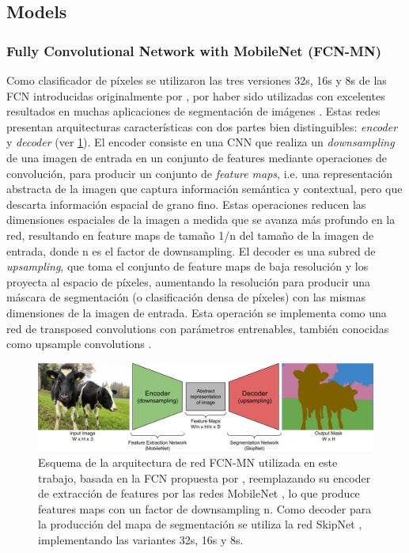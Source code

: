\documentclass[a4paper,authoryear,review]{elsarticle}
\begin{document}
\subsection{Models}
\subsubsection{Fully Convolutional Network with MobileNet (FCN-MN)} 
\label{sec:fcn}

Como clasificador de píxeles se utilizaron las tres versiones 32s, 16s y 8s de las FCN  introducidas originalmente por \citet{long2015fully}, por haber sido utilizadas con excelentes resultados en muchas aplicaciones de segmentación de imágenes \cite{litjens2017survey, garcia2018survey, kaymak2019brief}. Estas redes presentan arquitecturas características con dos partes bien distinguibles: \emph{encoder} y \emph{decoder} (ver \ref{fig:FCN-MN}). 
%
El encoder consiste en una CNN que realiza un \emph{downsampling} de una imagen de entrada en un conjunto de features mediante operaciones de convolución, para producir un conjunto de \emph{feature maps}, i.e. una representación abstracta de la imagen que captura información semántica y contextual, pero que descarta información espacial de grano fino. Estas operaciones reducen las dimensiones espaciales de la imagen a medida que se avanza más profundo en la red, resultando en feature maps de tamaño 1/n del tamaño de la imagen de entrada, donde n es el factor de downsampling. El decoder es una subred de \emph{upsampling}, que toma el conjunto de feature maps de baja resolución y los proyecta al espacio de píxeles, aumentando la resolución para producir una máscara de segmentación (o clasificación densa de píxeles) con las mismas dimensiones de la imagen de entrada. Esta operación se implementa como una red de transposed convolutions con parámetros entrenables, también conocidas como upsample convolutions \citet{shelhamer2017fully}. 

\begin{figure}
	\centering
	\includegraphics[width=12cm]{figures/Figure1.png}
	\caption{Esquema de la arquitectura de red FCN-MN utilizada en este trabajo, basada en la FCN propuesta por \citet{shelhamer2017fully}, reemplazando su encoder de extracción de features por las redes MobileNet \cite{howard2017mobilenets}, lo que produce features maps con un factor de downsampling n. Como decoder para la producción  del mapa de segmentación se utiliza la red SkipNet \cite{siam2018rtseg}, implementando las variantes 32s, 16s y 8s.}
	\label{fig:FCN-MN}
\end{figure}
\end{document}
